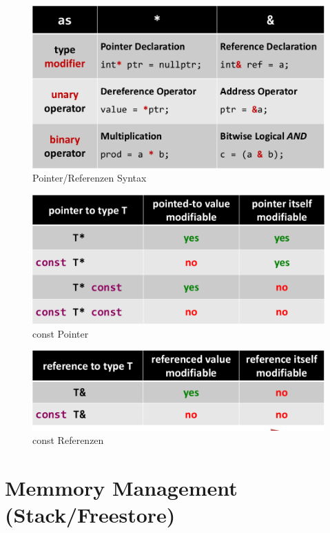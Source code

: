 \begin{figure}[h!]
\centering
\includegraphics[width=0.6\linewidth]{mainmatter/pics/syn}
\caption[Pointer/Referenzen Syntax]{Pointer/Referenzen Syntax}
\label{fig:syn}
\end{figure}
\begin{figure}[h!]
\centering
\includegraphics[width=0.6\linewidth]{mainmatter/pics/pconst}
\caption[const Pointer]{const Pointer}
\label{fig:pconst}
\end{figure}
\begin{figure}[h!]
\centering
\includegraphics[width=0.6\linewidth]{mainmatter/pics/rconst}
\caption[const Referenzen]{const Referenzen}
\label{fig:rconst}
\end{figure}
\newpage

\section{Memmory Management (Stack/Freestore)}
